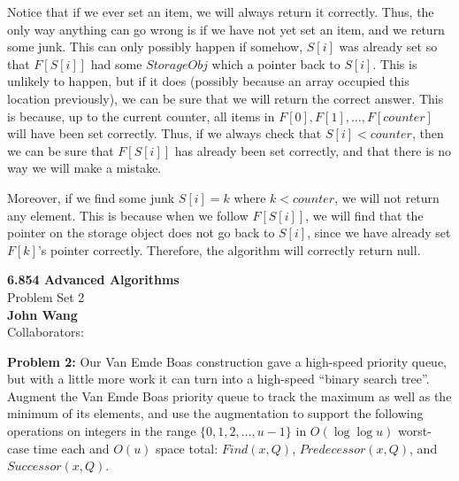 \documentclass[psamsfonts]{amsart}
\newenvironment{sol}{\vspace{0.25cm}{\large \bfseries Solution:}}{\qedsymbol}
\newenvironment{prob}[1]{\begin{framed}{\large \bfseries Problem #1:}}{\end{framed}}
\newcommand{\makenewtitle}{
\begin{center}
{\huge \bfseries 6.854 Advanced Algorithms} \\
Problem Set 2\\
\vspace{0.25cm}
{\bfseries John Wang} \\
Collaborators:
\end{center}
\vspace{0.5cm}
}
\begin{document}
\begin{sol}
Notice that if we ever set an item, we will always return it correctly. Thus, the only way anything can go wrong is if we have not yet set an item, and we return some junk. This can only possibly happen if somehow, $S[i]$ was already set so that $F[S[i]]$ had some $StorageObj$ which a pointer back to $S[i]$. This is unlikely to happen, but if it does (possibly because an array occupied this location previously), we can be sure that we will return the correct answer. This is because, up to the current counter, all items in $F[0], F[1], \ldots, F[counter]$ will have been set correctly. Thus, if we always check that $S[i] < counter$, then we can be sure that $F[S[i]]$ has already been set correctly, and that there is no way we will make a mistake.

Moreover, if we find some junk $S[i] = k$ where $k < counter$, we will not return any element. This is because when we follow $F[S[i]]$, we will find that the pointer on the storage object does not go back to $S[i]$, since we have already set $F[k]$'s pointer correctly. Therefore, the algorithm will correctly return null.
\end{sol}

\newpage
\makenewtitle

\begin{prob}{2}
Our Van Emde Boas construction gave a high-speed priority queue, but with a little more work it can turn into a high-speed ``binary search tree''. Augment the Van Emde Boas priority queue to track the maximum as well as the minimum of its elements, and use the augmentation to support the following operations on integers in the range $\{0,1,2,\ldots, u-1\}$ in $O(\log \log u)$ worst-case time each and $O(u)$ space total: $Find(x, Q)$, $Predecessor(x, Q)$, and $Successor(x,Q)$. 
\end{prob}
\end{document}
